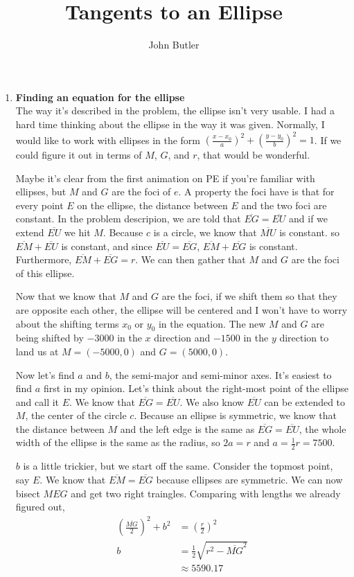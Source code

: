 \documentclass[11pt, oneside]{article}
\title{Tangents to an Ellipse}
\author{John Butler}
\date{}
\begin{document}
\maketitle

\begin{enumerate}
	\item \textbf{Finding an equation for the ellipse}\\
		The way it's described in the problem, the ellipse isn't very usable. I had a hard time thinking about the ellipse in the way it was given.
		Normally, I would like to work with ellipses in the form $\left(\frac {x - x_0} a\right)^2 + \left(\frac {y-y_0} b\right)^2 = 1$. If we could 
		figure it out in terms of $M$, $G$, and $r$, that would be wonderful.
		
		Maybe it's clear from the first animation on PE if you're familiar with ellipses, but $M$ and $G$ are the foci of $e$. A property the foci have is
		that for every point $E$ on the ellipse, the distance between $E$ and the two foci are constant. In the problem descripion, we are told that 
		$\overline{EG}=\overline{EU}$ and if we extend $\overline{EU}$ we hit $M$. Because $c$ is a circle, we know that $\overline{MU}$ is constant.
		so $\overline{EM} + \overline{EU}$ is constant, and since $\overline{EU}=\overline{EG}$, $\overline{EM} + \overline{EG}$ is constant. Furthermore,
		$\overline{EM}+\overline{EG}=r$. We can then gather that $M$ and $G$ are the foci of this ellipse.

		Now that we know that $M$ and $G$ are the foci, if we shift them so that they are opposite each other, the ellipse will be centered and I won't
		have to worry about the shifting terms $x_0$ or $y_0$ in the equation. The new $M$ and $G$ are being shifted by $-3000$ in the $x$ direction and
		$-1500$ in the $y$ direction to land us at $M=(-5000,0)$ and $G=(5000,0)$.

		Now let's find $a$ and $b$, the semi-major and semi-minor axes. It's easiest to find $a$ first in my opinion. Let's think about the right-most 
		point of the ellipse and call it $E$. We know that $\overline{EG}=\overline{EU}$. We also know $\overline{EU}$ can be extended to $M$, the center 
		of the circle $c$. Because an ellipse is symmetric, we know that the distance between $M$ and the left edge is the same as 
		$\overline{EG} = \overline{EU}$, the whole width of the ellipse is the same as the radius, so $2a=r$ and $a = \frac 1 2 r = 7500$.

		$b$ is a little trickier, but we start off the same. Consider the topmost point, say $E$. We know that $\overline{EM}=\overline{EG}$ because
		ellipses are symmetric. We can now bisect $MEG$ and get two right traingles. Comparing with lengths we already figured out, 
		\begin{align*}
			\left(\frac{\overline{MG}} 2\right)^2 + b^2 &= \left(\frac r 2\right)^2\\
			b &= \frac12\sqrt{r^2 - \overline{MG}^2}\\
			&\approx 5590.17
		\end{align*}
		

\end{enumerate}
\end{document}
